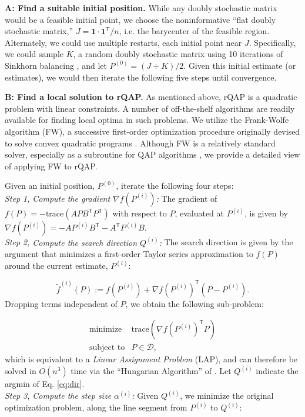 \documentclass[10pt]{article}
\providecommand{\mc}[1]{\mathcal{#1}}
\providecommand{\mt}[1]{\widetilde{#1}}
\providecommand{\mc}[1]{\mathcal{#1}}
\providecommand{\mt}[1]{\widetilde{#1}}
\newcommand{\T}{^{\ensuremath{\mathsf{T}}}}
\providecommand{\ve}[1]{\boldsymbol{#1}}
\begin{document}
\noindent\textbf{A: Find a suitable initial position.}  While any doubly stochastic matrix would be a feasible initial point, we choose the 
noninformative
``flat doubly  stochastic matrix,'' $J=\ve{1} \cdot \ve{1}\T/n$, i.e. the barycenter of the feasible region.
Alternately, we could use multiple restarts, each initial point near $J$.  Specifically, we could sample $K$, a random doubly stochastic matrix using 10 iterations of Sinkhorn balancing \cite{Sinkhorn1964}, and let $P^{(0)}=(J+K)/2$. Given this initial estimate (or estimates), we would then iterate the following five steps until convergence.


\noindent\textbf{B: Find a local solution to rQAP.} As mentioned above, rQAP is a quadratic problem with linear constraints.  A number of off-the-shelf algorithms are readily available for finding local optima in such problems.  We utilize the Frank-Wolfe algorithm (FW), a successive first-order optimization procedure originally devised to solve convex quadratic programs \cite{Frank1956, Bradley1977}.
Although FW is a relatively standard solver, especially as a subroutine for QAP algorithms \cite{Anstreicher03}, we provide a detailed view of applying FW to rQAP.

Given an initial position, $P^{(0)}$, iterate the following four steps:\\
{\it Step 1,} {\it Compute the gradient $\nabla f(P^{(i)})$:}  The gradient of $f(P)=-\text{trace}(APB\T P\T)$ with respect to $P$, evaluated at $P^{(i)}$, is given by $\label{eq:grad}
	\nabla f (P^{(i)}) = 
	  - A P^{(i)} B\T - A\T P^{(i)} B.$\\
{\it Step 2,} {\it Compute the search direction $Q^{(i)}$:} The search direction is given by the argument that minimizes a first-order Taylor series approximation to $f(P)$ around the current estimate, $P^{(i)}$:

\begin{equation}
	\mt{f}^{(i)}(P) := f(P^{(i)}) + \nabla f(P^{(i)})\T(P - P^{(i)}).
\end{equation}
Dropping terms independent of $P$, we obtain the following sub-problem:

\begin{equation}
\begin{array}{cl}
			\text{minimize}   & \text{trace}(\nabla f(P^{(i)})\T P) \\
			\text{subject to}  &P \in \mc{D},   
\end{array} \label{eq:dir}
\end{equation}
which is equivalent to a \emph{Linear Assignment Problem} (LAP), and can therefore be solved in $O(n^3)$ time via the ``Hungarian Algorithm'' of \cite{Kuhn1955, Jonker1987}.  
Let $Q^{(i)}$ indicate the argmin of Eq. \eqref{eq:dir}.
\\
{\it Step 3,} {\it Compute the step size $\alpha^{(i)}$:} Given $Q^{(i)}$, we minimize the original optimization problem, along the line segment from $P^{(i)}$ to $Q^{(i)}$:    
\end{document}
